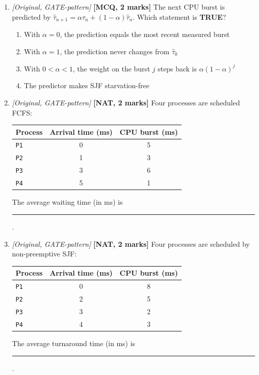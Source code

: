\documentclass[11pt]{article}
\begin{document}
\begin{enumerate}
\item[\textbf{Q4}] \textit{[Original, GATE-pattern]} \textbf{[MCQ, 2 marks]} The next CPU burst is predicted by $\hat{\tau}_{n+1} = \alpha\tau_n + (1-\alpha)\hat{\tau}_n$. Which statement is \textbf{TRUE}?
\begin{enumerate}
  \item[(A)] With $\alpha = 0$, the prediction equals the most recent measured burst
  \item[(B)] With $\alpha = 1$, the prediction never changes from $\hat{\tau}_0$
  \item[(C)] With $0 < \alpha < 1$, the weight on the burst $j$ steps back is $\alpha(1-\alpha)^j$
  \item[(D)] The predictor makes SJF starvation-free
\end{enumerate}

\item[\textbf{Q5}] \textit{[Original, GATE-pattern]} \textbf{[NAT, 2 marks]} Four processes are scheduled FCFS:
\begin{center}\small\begin{tabular}{lcc}\toprule Process & Arrival time (ms) & CPU burst (ms) \\ \midrule \texttt{P1} & 0 & 5 \\ \texttt{P2} & 1 & 3 \\ \texttt{P3} & 3 & 6 \\ \texttt{P4} & 5 & 1 \\ \bottomrule\end{tabular}\end{center}
The average waiting time (in ms) is \rule{1.5cm}{0.4pt}.

\item[\textbf{Q6}] \textit{[Original, GATE-pattern]} \textbf{[NAT, 2 marks]} Four processes are scheduled by non-preemptive SJF:
\begin{center}\small\begin{tabular}{lcc}\toprule Process & Arrival time (ms) & CPU burst (ms) \\ \midrule \texttt{P1} & 0 & 8 \\ \texttt{P2} & 2 & 5 \\ \texttt{P3} & 3 & 2 \\ \texttt{P4} & 4 & 3 \\ \bottomrule\end{tabular}\end{center}
The average turnaround time (in ms) is \rule{1.5cm}{0.4pt}.


\end{enumerate}
\end{document}
